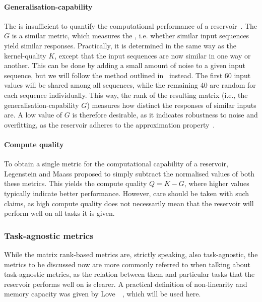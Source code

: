 \paragraph{Generalisation-capability}
The  is insufficient to quantify the computational performance of a reservoir~\cite{WhatMakesPowerful,RC_ASI,IL_Masterproef}.
The  $G$ is a similar metric, which measures the , i.e. whether similar input sequences yield similar responses.
Practically, it is determined in the same way as the kernel-quality $K$, except that the input sequences are now similar in one way or another.
This can be done by adding a small amount of noise to a given input sequence, but we will follow the method outlined in~\cite{RC_ASI} instead.
The first 60 input values will be shared among all sequences, while the remaining 40 are random for each sequence individually.
This way, the rank of the resulting matrix (i.e., the generalisation-capability $G$) measures how distinct the responses of similar inputs are.
A low value of $G$ is therefore desirable, as it indicates robustness to noise and overfitting, as the reservoir adheres to the approximation property~\cite{RCbenchmarksReview1}.

\paragraph{Compute quality}
To obtain a single metric for the computational capability of a reservoir, Legenstein and Maass proposed to simply subtract the normalised values of both these metrics.
This yields the compute quality $Q = K - G$, where higher values typically indicate better performance.
However, care should be taken with such claims, as high compute quality does not necessarily mean that the reservoir will perform well on all tasks it is given.

\subsubsection{Task-agnostic metrics}
While the matrix rank-based metrics are, strictly speaking, also task-agnostic, the metrics to be discussed now are more commonly referred to when talking about task-agnostic metrics, as the relation between them and particular tasks that the reservoir performs well on is clearer.
A practical definition of non-linearity and memory capacity was given by Love~\etal~\citet{RC_TaskAgnosticMetrics_v2}, which will be used here.


